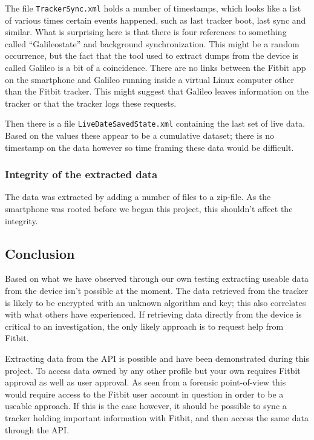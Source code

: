 \documentclass[a4paper,11pt,dvips]{article}
\begin{document}
The file \texttt{TrackerSync.xml} holds a number of timestamps, which looks like a list of various times certain events happened, such as last tracker boot, last sync and similar. What is surprising here is that there is four references to something called “Galileostate” and background synchronization. This might be a random occurrence, but the fact that the tool used to extract dumps from the device is called Galileo is a bit of a coincidence. There are no links between the Fitbit app on the smartphone and Galileo running inside a virtual Linux computer other than the Fitbit tracker. This might suggest that Galileo leaves information on the tracker or that the tracker logs these requests.

Then there is a file \texttt{LiveDateSavedState.xml} containing the last set of live data. Based on the values these appear to be a cumulative dataset; there is no timestamp on the data however so time framing these data would be difficult.

\subsubsection{Integrity of the extracted data}
The data was extracted by adding a number of files to a zip-file. As the smartphone was rooted before we began this project, this shouldn’t affect the integrity.


\subsection{Conclusion}

Based on what we have observed through our own testing extracting useable data from the device isn’t possible at the moment. The data retrieved from the tracker is likely to be encrypted with an unknown algorithm and key; this also correlates with what others have experienced. If retrieving data directly from the device is critical to an investigation, the only likely approach is to request help from Fitbit.

Extracting data from the API is possible and have been demonstrated during this project. To access data owned by any other profile but your own requires Fitbit approval as well as user approval. As seen from a forensic point-of-view this would require access to the Fitbit user account in question in order to be a useable approach. If this is the case however, it should be possible to sync a tracker holding important information with Fitbit, and then access the same data through the API.
\end{document}
